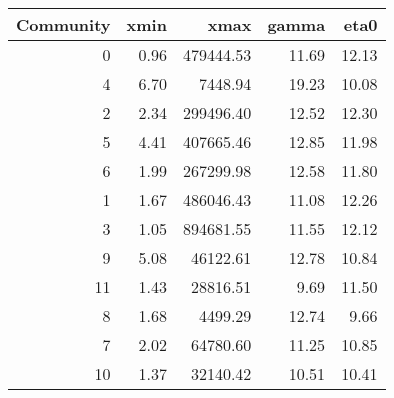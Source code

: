 \begin{tabular}{rrrrr}
\toprule
 Community &  xmin &      xmax &  gamma &  eta0 \\
\midrule
         0 &  0.96 & 479444.53 &  11.69 & 12.13 \\
         4 &  6.70 &   7448.94 &  19.23 & 10.08 \\
         2 &  2.34 & 299496.40 &  12.52 & 12.30 \\
         5 &  4.41 & 407665.46 &  12.85 & 11.98 \\
         6 &  1.99 & 267299.98 &  12.58 & 11.80 \\
         1 &  1.67 & 486046.43 &  11.08 & 12.26 \\
         3 &  1.05 & 894681.55 &  11.55 & 12.12 \\
         9 &  5.08 &  46122.61 &  12.78 & 10.84 \\
        11 &  1.43 &  28816.51 &   9.69 & 11.50 \\
         8 &  1.68 &   4499.29 &  12.74 &  9.66 \\
         7 &  2.02 &  64780.60 &  11.25 & 10.85 \\
        10 &  1.37 &  32140.42 &  10.51 & 10.41 \\
\bottomrule
\end{tabular}
